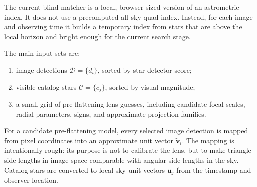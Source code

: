 \documentclass[11pt]{article}
\begin{document}
The current blind matcher is a local, browser-sized version of an astrometric
index. It does not use a precomputed all-sky quad index. Instead, for each
image and observing time it builds a temporary index from stars that are above
the local horizon and bright enough for the current search stage.

The main input sets are:
\begin{enumerate}
  \item image detections \(\mathcal{D}=\{d_i\}\), sorted by star-detector
        score;
  \item visible catalog stars \(\mathcal{C}=\{c_j\}\), sorted by visual
        magnitude;
  \item a small grid of pre-flattening lens guesses, including candidate
        focal scales, radial parameters, signs, and approximate projection
        families.
\end{enumerate}
For a candidate pre-flattening model, every selected image detection is mapped
from pixel coordinates into an approximate unit vector
\(\tilde{\mathbf{v}}_i\). The mapping is intentionally rough: its purpose is
not to calibrate the lens, but to make triangle side lengths in image space
comparable with angular side lengths in the sky. Catalog stars are converted to
local sky unit vectors \(\mathbf{u}_j\) from the timestamp and observer
location.
\end{document}
